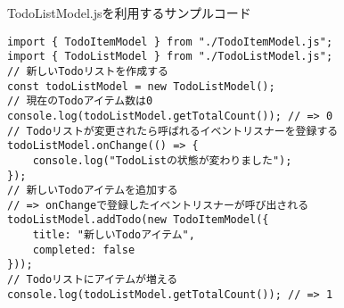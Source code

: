 \begin{listtitle}
TodoListModel.jsを利用するサンプルコード
\end{listtitle}
\begin{lstlisting}
import { TodoItemModel } from "./TodoItemModel.js";
import { TodoListModel } from "./TodoListModel.js";
// 新しいTodoリストを作成する
const todoListModel = new TodoListModel();
// 現在のTodoアイテム数は0
console.log(todoListModel.getTotalCount()); // => 0
// Todoリストが変更されたら呼ばれるイベントリスナーを登録する
todoListModel.onChange(() => {
    console.log("TodoListの状態が変わりました");
});
// 新しいTodoアイテムを追加する
// => onChangeで登録したイベントリスナーが呼び出される
todoListModel.addTodo(new TodoItemModel({
    title: "新しいTodoアイテム",
    completed: false
}));
// Todoリストにアイテムが増える
console.log(todoListModel.getTotalCount()); // => 1
\end{lstlisting}
\listend
